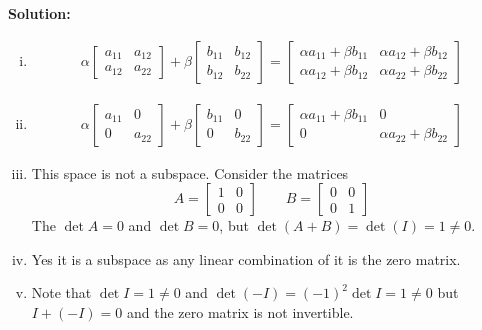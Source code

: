 \documentclass[a4paper,11pt]{article}
\newenvironment{solution}{ \noindent \textbf{Solution: \medskip}}{}
\begin{document}
\begin{solution}
	\begin{enumerate}[(i)]
		\item \begin{align}
			\alpha \left[\begin{matrix}
				a_{11} & a_{12} \\
				a_{12} & a_{22}
			\end{matrix}\right] +
			\beta \left[\begin{matrix}
				b_{11} & b_{12} \\
				b_{12} & b_{22}
			\end{matrix}\right] = 
			\left[\begin{matrix}
				\alpha a_{11} + \beta b_{11} & \alpha a_{12} + \beta b_{12} \\
				\alpha a_{12} + \beta b_{12} & \alpha a_{22} + \beta b_{22} 
			\end{matrix}\right] \nonumber
		\end{align}
	\item \begin{align}
			\alpha \left[\begin{matrix}
				a_{11} & 0 \\
				0 & a_{22}
			\end{matrix}\right] +
			\beta \left[\begin{matrix}
				b_{11} & 0 \\
				0 & b_{22}
			\end{matrix}\right] = 
			\left[\begin{matrix}
				\alpha a_{11} + \beta b_{11} & 0 \\
				0 & \alpha a_{22} + \beta b_{22} 
			\end{matrix}\right] \nonumber
		\end{align}
		\item This space is not a subspace.
		Consider the matrices 
		\[
			A = \left[\begin{matrix}
				1 & 0 \\
				0 & 0
			\end{matrix}\right] \qquad
			B = \left[\begin{matrix}
				0 & 0 \\
				0 & 1
			\end{matrix}\right]
		\]
		The $\det A = 0$ and $\det B = 0$, but $\det(A + B) = \det(I) = 1 \neq 0$.
		\item Yes it is a subspace as any linear combination of it is the zero matrix.
		\item Note that $\det I = 1 \neq 0$ and $\det(-I) = (-1)^2 \det I = 1 \neq 0$ but $I + (-I) = 0$ and the zero matrix is not invertible.
	\end{enumerate}
\end{solution}
\end{document}

